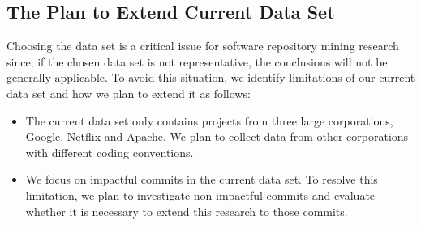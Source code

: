 \subsection{The Plan to Extend Current Data Set}

Choosing the data set is a critical issue for software repository mining research since, if the chosen data set is not representative, the conclusions will not be generally applicable.
To avoid this situation, we identify limitations of our current data set and how we plan to extend it as follows:
\begin{itemize}
    \item The current data set only contains projects from three large corporations, Google, Netflix and Apache. We plan to collect data from other corporations with different coding conventions.
    \item We focus on impactful commits in the current data set. To resolve this limitation, we plan to investigate non-impactful commits and evaluate whether it is necessary to extend this research to those commits.
\end{itemize}

